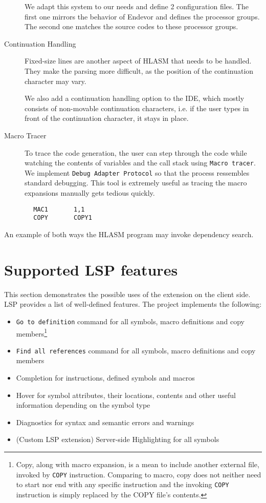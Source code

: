 \begin{description}
We adapt this system to our needs and define 2 configuration files. The first one mirrors the behavior of Endevor and defines the processor groups. The second one matches the source codes to these processor groups.

\item [Continuation Handling] Fixed-size lines are another aspect of HLASM that needs to be handled. They make the parsing more difficult, as the position of the continuation character may vary. 

We also add a continuation handling option to the IDE, which mostly consists of non-movable continuation characters, i.e. if the user types in front of the continuation character, it stays in place.

\item [Macro Tracer] To trace the code generation, the user can step through the code while watching the contents of variables and the call stack using \texttt{Macro tracer}. We implement \texttt{Debug Adapter Protocol} so that the process ressembles standard debugging. This tool is extremely useful as tracing the macro expansions manually gets tedious quickly.
\end{description}

\pagebreak
\begin{listing}
\begin{verbatim}
        MAC1       1,1                   
        COPY       COPY1
\end{verbatim} 
\caption{An example of both ways the HLASM program may invoke dependency search.}
\label{lst:search}
\end{listing}

\section{Supported LSP features}
This section demonstrates the possible uses of the extension on the client side. LSP provides a list of well-defined features. The project implements the following:

\begin{itemize}
	\item \texttt{Go to definition} command for all symbols, macro definitions and copy members\footnote{Copy, along with macro expansion, is a mean to include another external file, invoked by \texttt{COPY} instruction. Comparing to macro, copy does not neither need to start nor end with any specific instruction and the invoking \texttt{COPY} instruction is simply replaced by the COPY file's contents.}
	\item \texttt{Find all references} command for all symbols, macro definitions and copy members
	\item Completion for instructions, defined symbols and macros
	\item Hover for symbol attributes, their locations, contents and other useful information depending on the symbol type
	\item Diagnostics for syntax and semantic errors and warnings
	\item (Custom LSP extension) Server-side Highlighting for all symbols  
\end{itemize}

